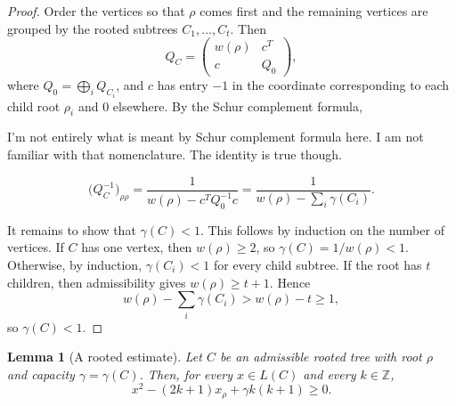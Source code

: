 \documentclass[12pt]{article}
\newtheorem{lemma}{Lemma}
\newcommand{\review}[1]{\begin{reviewbox}#1\end{reviewbox}}
\begin{document}
\begin{proof}
Order the vertices so that \(\rho\) comes first and the remaining vertices are grouped by the rooted subtrees \(C_1,\dots,C_t\). Then
\[
Q_C=
\begin{pmatrix}
w(\rho) & c^T\\
c & Q_0
\end{pmatrix},
\]
where \(Q_0=\bigoplus_i Q_{C_i}\), and \(c\) has entry \(-1\) in the coordinate corresponding to each child root \(\rho_i\) and \(0\) elsewhere. By the Schur complement formula,\review{I'm not entirely what is meant by Schur complement formula here. I am not familiar with that nomenclature. The identity is true though.}
\[
\bigl(Q_C^{-1}\bigr)_{\rho\rho}
=
\frac{1}{w(\rho)-c^TQ_0^{-1}c}
=
\frac{1}{w(\rho)-\sum_i \gamma(C_i)}.
\]

It remains to show that \(\gamma(C)<1\). This follows by induction on the number of vertices. If \(C\) has one vertex, then \(w(\rho)\ge 2\), so \(\gamma(C)=1/w(\rho)<1\). Otherwise, by induction, \(\gamma(C_i)<1\) for every child subtree. If the root has \(t\) children, then admissibility gives \(w(\rho)\ge t+1\). Hence
\[
w(\rho)-\sum_i \gamma(C_i)>w(\rho)-t\ge 1,
\]
so \(\gamma(C)<1\).
\end{proof}

\begin{lemma}[A rooted estimate]
Let \(C\) be an admissible rooted tree with root \(\rho\) and capacity \(\gamma=\gamma(C)\). Then, for every \(x\in L(C)\) and every \(k\in \mathbb Z\),
\[
x^2-(2k+1)x_\rho+\gamma k(k+1)\ge 0.
\]
\end{lemma}
\end{document}
